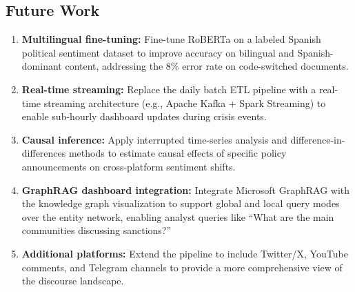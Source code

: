 \documentclass[12pt, letterpaper]{article}
\begin{document}
\subsection{Future Work}
\begin{enumerate}
  \item \textbf{Multilingual fine-tuning:} Fine-tune RoBERTa on a labeled Spanish political sentiment dataset to improve accuracy on bilingual and Spanish-dominant content, addressing the 8\% error rate on code-switched documents.
  \item \textbf{Real-time streaming:} Replace the daily batch ETL pipeline with a real-time streaming architecture (e.g., Apache Kafka + Spark Streaming) to enable sub-hourly dashboard updates during crisis events.
  \item \textbf{Causal inference:} Apply interrupted time-series analysis and difference-in-differences methods to estimate causal effects of specific policy announcements on cross-platform sentiment shifts.
  \item \textbf{GraphRAG dashboard integration:} Integrate Microsoft GraphRAG with the knowledge graph visualization to support global and local query modes over the entity network, enabling analyst queries like ``What are the main communities discussing sanctions?''
  \item \textbf{Additional platforms:} Extend the pipeline to include Twitter/X, YouTube comments, and Telegram channels to provide a more comprehensive view of the discourse landscape.
\end{enumerate}
\end{document}
